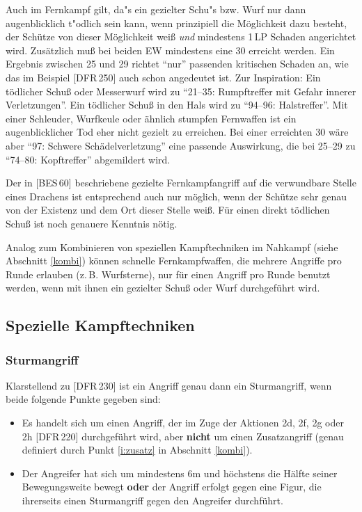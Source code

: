 \documentclass[10pt,a4paper,germanpar]{article}
\begin{document}
Auch im Fernkampf gilt, da"s ein gezielter Schu"s bzw. Wurf nur dann
augenblicklich t"odlich sein kann, wenn prinzipiell die Möglichkeit
dazu besteht, der Schütze von dieser Möglichkeit weiß \emph{und}
mindestens 1\,LP Schaden angerichtet wird. Zusätzlich muß bei beiden
EW mindestens eine 30 erreicht werden. Ein Ergebnis zwischen 25 und 29
richtet "`nur"' passenden kritischen Schaden an, wie das im Beispiel
[DFR\,250] auch schon angedeutet ist. Zur Inspiration: Ein tödlicher
Schuß oder Messerwurf wird zu "`21--35: Rumpftreffer mit Gefahr
innerer Verletzungen"'. Ein tödlicher Schuß in den Hals wird zu
"`94--96: Halstreffer"'. Mit einer Schleuder, Wurfkeule oder ähnlich
stumpfen Fernwaffen ist ein augenblicklicher Tod eher nicht gezielt zu
erreichen. Bei einer erreichten 30 wäre aber "`97: Schwere
Schädelverletzung"' eine passende Auswirkung, die bei 25--29 zu
"`74--80: Kopftreffer"' abgemildert wird.

Der in [BES\,60] beschriebene gezielte Fernkampfangriff auf die
verwundbare Stelle eines Drachens ist entsprechend auch nur möglich,
wenn der Schütze sehr genau von der Existenz und dem Ort dieser Stelle
weiß. Für einen direkt tödlichen Schuß ist noch genauere Kenntnis
nötig.

Analog zum Kombinieren von speziellen Kampftechniken im Nahkampf
(siehe Abschnitt \ref{kombi}) können schnelle Fernkampfwaffen, die
mehrere Angriffe pro Runde erlauben (z.\,B. Wurfsterne), nur für einen
Angriff pro Runde benutzt werden, wenn mit ihnen ein gezielter Schuß
oder Wurf durchgeführt wird.

\subsection{Spezielle Kampftechniken}

\subsubsection{Sturmangriff}
\label{sturm}

Klarstellend zu [DFR\,230] ist ein Angriff genau dann ein
Sturmangriff, wenn beide folgende Punkte gegeben sind:
\begin{itemize}
\item Es handelt sich um einen Angriff, der im Zuge der Aktionen 2d,
  2f, 2g oder 2h [DFR\,220] durchgeführt wird, aber \textbf{nicht} um
  einen Zusatzangriff (genau definiert durch Punkt \ref{i:zusatz} in
  Abschnitt \ref{kombi}).
\item Der Angreifer hat sich um mindestens 6m und höchstens die Hälfte
  seiner Bewegungsweite bewegt \textbf{oder} der Angriff erfolgt gegen
  eine Figur, die ihrerseits einen Sturmangriff gegen den Angreifer
  durchführt.
\end{itemize}
\end{document}
